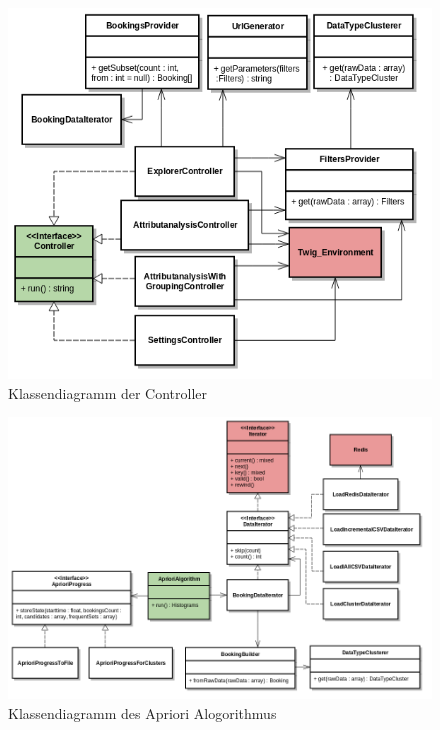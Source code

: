 \begin{figure}[H]
	\centering
	\includegraphics[width=1\textwidth]{images/diagram-class-Controller}
	\caption{Klassendiagramm der Controller}
	\label{fig:proofofconcept:klassenstruktur:1}
\end{figure}
\begin{figure}
	\centering
	\includegraphics[width=1\textwidth]{images/diagram-class-AprioriAlgorithm}
	\caption{Klassendiagramm des Apriori Alogorithmus}
	\label{fig:proofofconcept:klassenstruktur:2}
\end{figure}
